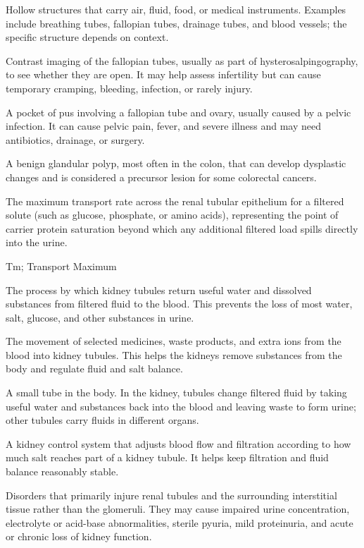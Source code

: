  Hollow structures that carry air, fluid, food, or medical instruments. Examples include breathing tubes, fallopian tubes, drainage tubes, and blood vessels; the specific structure depends on context.

 Contrast imaging of the fallopian tubes, usually as part of hysterosalpingography, to see whether they are open. It may help assess infertility but can cause temporary cramping, bleeding, infection, or rarely injury.

 A pocket of pus involving a fallopian tube and ovary, usually caused by a pelvic infection. It can cause pelvic pain, fever, and severe illness and may need antibiotics, drainage, or surgery.

 A benign glandular polyp, most often in the colon, that can develop dysplastic changes and is considered a precursor lesion for some colorectal cancers.

 The maximum transport rate across the renal tubular epithelium for a filtered solute (such as glucose, phosphate, or amino acids), representing the point of carrier protein saturation beyond which any additional filtered load spills directly into the urine.

\synonyms
Tm; Transport Maximum

 The process by which kidney tubules return useful water and dissolved substances from filtered fluid to the blood. This prevents the loss of most water, salt, glucose, and other substances in urine.

 The movement of selected medicines, waste products, and extra ions from the blood into kidney tubules. This helps the kidneys remove substances from the body and regulate fluid and salt balance.

 A small tube in the body. In the kidney, tubules change filtered fluid by taking useful water and substances back into the blood and leaving waste to form urine; other tubules carry fluids in different organs.

 A kidney control system that adjusts blood flow and filtration according to how much salt reaches part of a kidney tubule. It helps keep filtration and fluid balance reasonably stable.

 Disorders that primarily injure renal tubules and the surrounding interstitial tissue rather than the glomeruli. They may cause impaired urine concentration, electrolyte or acid-base abnormalities, sterile pyuria, mild proteinuria, and acute or chronic loss of kidney function.

